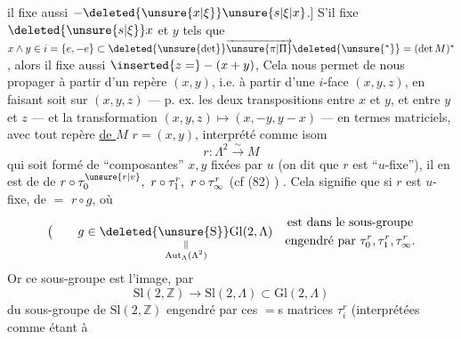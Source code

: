 il fixe aussi $-\deleted{\unsure{x|\xi}}\unsure{s|\xi|x}$.] S'il fixe $\deleted{\unsure{s|\xi}}x$ et $y$ tels que $x\wedge y\in i=\{e,-e\}\subset\deleted{\unsure{\det}}\overrightarrow{\unsure{\pi|\Pi}}\deleted{\unsure{{}^*}}=(\det M)^*$, alors il fixe aussi $\inserted{z=}-(x+y)$,  Cela nous permet de nous propager à partir d'un repère $(x,y)$,   i.e. à partir d'une $i$-face $(x,y,z)$, en faisant soit  sur $(x,y,z)$ --- p. ex. les deux transpositions entre $x$ et $y$, et entre $y$ et $z$ --- et la transformation $(x,y,z)\longmapsto(x,-y,y-x)$ ---
en termes matriciels, avec tout repère \uline{de $M$} $r=(x,y)$, interprété comme isom
\[
 r:\Lambda^2\xrightarrow{\sim}M
\]
qui soit formé de ``composantes'' $x,y$ fixées par $u$ (on dit que $r$ est ``$u$-fixe''), il en est de  de $r\circ\tau_0^{\unsure{r|v}},\ r\circ\tau_1^r,\ r\circ\tau_\infty^r$ (cf (82) ) .
Cela signifie que si $r$ est $u$-fixe, de $=$ $r\circ g$, où
\[
 \bigl(\qquad g\in\underset{\substack{\Vert\\\operatorname{Aut}_\Lambda(\Lambda^2)}}{\mathrm{\deleted{\unsure{S}}Gl}(2,\Lambda)}
 \quad\begin{gathered}\text{est dans le sous-groupe}\\\text{engendré par }\tau_0^r,\tau_1^r,\tau_\infty^r.\end{gathered}
\]
Or ce sous-groupe est l'image, par
\[
 \mathrm{Sl}(2,\mathbb Z)\longrightarrow\mathrm{Sl}(2,\Lambda)\subset\mathrm{Gl}(2,\Lambda)
\]
du sous-groupe de $\mathrm{Sl}(2,\mathbb Z)$ engendré par ces $=$s matrices $\tau_i^r$ (interprétées comme étant à
